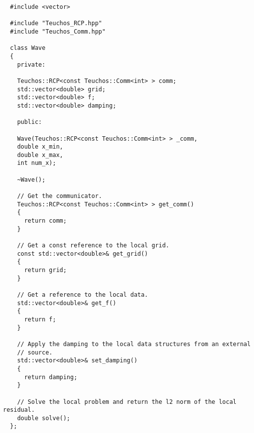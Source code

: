 \documentclass[letterpaper]{article}
\begin{document}
\begin{lstlisting}
  #include <vector>

  #include "Teuchos_RCP.hpp"
  #include "Teuchos_Comm.hpp"

  class Wave
  {
    private:
    
    Teuchos::RCP<const Teuchos::Comm<int> > comm;
    std::vector<double> grid;
    std::vector<double> f;
    std::vector<double> damping;

    public:

    Wave(Teuchos::RCP<const Teuchos::Comm<int> > _comm,
    double x_min,
    double x_max,
    int num_x);

    ~Wave();

    // Get the communicator.
    Teuchos::RCP<const Teuchos::Comm<int> > get_comm()
    {
      return comm;
    }

    // Get a const reference to the local grid.
    const std::vector<double>& get_grid()
    {
      return grid;
    }

    // Get a reference to the local data.
    std::vector<double>& get_f()
    {
      return f;
    }

    // Apply the damping to the local data structures from an external
    // source. 
    std::vector<double>& set_damping()
    {
      return damping;
    }

    // Solve the local problem and return the l2 norm of the local residual.
    double solve();
  };
\end{lstlisting}
\end{document}
